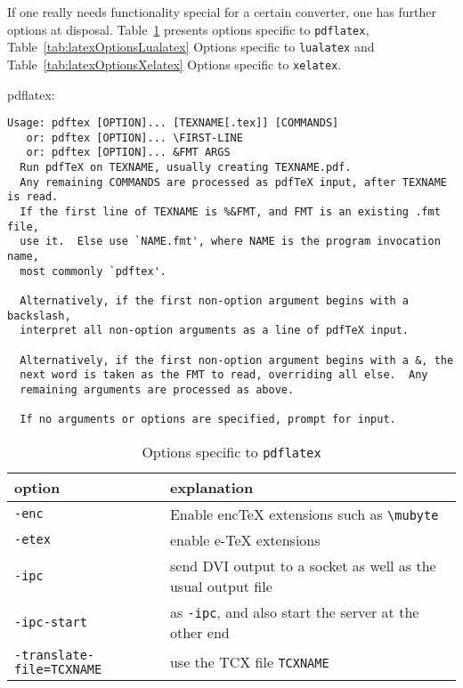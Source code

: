\documentclass{article}
\newcommand{\pdflatex}{\texttt{pdflatex}}
\newcommand{\lualatex}{\texttt{lualatex}}
\newcommand{\xelatex}{\texttt{xelatex}}
\begin{document}
If one really needs functionality special for a certain converter, 
one has further options at disposal. 
Table~\ref{tab:latexOptionsPdflatex} presents options specific to \pdflatex{}, 
Table~\ref{tab:latexOptionsLualatex} Options specific to \lualatex{} and 
Table~\ref{tab:latexOptionsXelatex} Options specific to \xelatex. 





pdflatex: 

\begin{verbatim}
Usage: pdftex [OPTION]... [TEXNAME[.tex]] [COMMANDS]
   or: pdftex [OPTION]... \FIRST-LINE
   or: pdftex [OPTION]... &FMT ARGS
  Run pdfTeX on TEXNAME, usually creating TEXNAME.pdf.
  Any remaining COMMANDS are processed as pdfTeX input, after TEXNAME is read.
  If the first line of TEXNAME is %&FMT, and FMT is an existing .fmt file,
  use it.  Else use `NAME.fmt', where NAME is the program invocation name,
  most commonly `pdftex'.

  Alternatively, if the first non-option argument begins with a backslash,
  interpret all non-option arguments as a line of pdfTeX input.

  Alternatively, if the first non-option argument begins with a &, the
  next word is taken as the FMT to read, overriding all else.  Any
  remaining arguments are processed as above.

  If no arguments or options are specified, prompt for input.
\end{verbatim}

  {\small
  \begin{longtable}{|ll|}
  \toprule
  option & explanation \\
  \midrule
  \midrule
  \endfirsthead%
  \bottomrule
  \caption{\label{tab:latexOptionsPdflatex} Options specific to \pdflatex{} }
  \endlastfoot%
  \texttt{-enc}                    & Enable encTeX extensions such as \texttt{\textbackslash{}mubyte} \\
  \texttt{-etex}                   & enable e-TeX extensions \\
  \texttt{-ipc}                    & send DVI output to a socket as well as the usual output file \\
  \texttt{-ipc-start}              & as \texttt{-ipc}, and also start the server at the other end \\
  \texttt{-translate-file=TCXNAME} & use the TCX file \texttt{TCXNAME} \\
  \end{longtable}
  }
\end{document}
